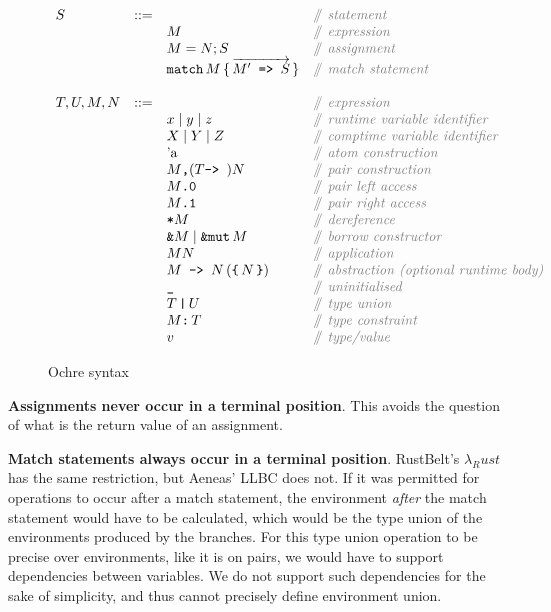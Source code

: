 \documentclass[12pt,twoside]{report}
\begin{document}
\begin{figure}[H]
  \arraycolsep=1pt %
  \centering

  \vspace{-2ex} %
  \[
  \begin{array}[t]{llll}
    S & ::= & & \ocomment{statement} \\
    & & M & \ocomment{expression} \\
    & & M = N; S & \ocomment{assignment} \\
    & & \mono{match}\,M\,\{\,\overrightarrow{M'\mono{ => }S}\,\} & \ocomment{match statement} \\
    \\
    T, U, M, N & ::= & & \ocomment{expression} \\
    && x \mid{} y \mid{} z  & \ocomment{runtime variable identifier} \\
    && X \mid{} Y \mid{} Z  & \ocomment{comptime variable identifier} \\
    && \atom{a} & \ocomment{atom construction} \\
    && M\mono{,} (T \mono{-> }) N & \ocomment{pair construction} \\
    && \pleft{M} & \ocomment{pair left access} \\
    && \pright{M} & \ocomment{pair right access} \\
    && \deref{M} & \ocomment{dereference} \\
    && \mono{\&}M \mid \mono{\&mut}\,M & \ocomment{borrow constructor} \\
    && M N & \ocomment{application} \\
    && \mono{$M$ -> $N$} \,(\mono{\{}\,N\,\mono{\}}) & \ocomment{abstraction (optional runtime body)} \\
    && \mono{\_} & \ocomment{uninitialised} \\
    && T\,\mono{|}\,U & \ocomment{type union} \\
    && M\mono{:}\,T & \ocomment{type constraint} \\
    && v & \ocomment{type/value} \\
  \end{array} %
  \]
\caption{Ochre syntax} %
\label{fig:syntax} %
\end{figure} %

\textbf{Assignments never occur in a terminal position}. This avoids the question of what is the return value of an assignment.

\textbf{Match statements always occur in a terminal position}. RustBelt's $\lambda_Rust$ \cite{jungRustBeltSecuringFoundations2018a} has the same restriction, but Aeneas' LLBC \cite{aeneas} does not. If it was permitted for operations to occur after a match statement, the environment \textit{after} the match statement would have to be calculated, which would be the type union of the environments produced by the branches. For this type union operation to be precise over environments, like it is on pairs, we would have to support dependencies between variables. We do not support such dependencies for the sake of simplicity, and thus cannot precisely define environment union.
\end{document}
